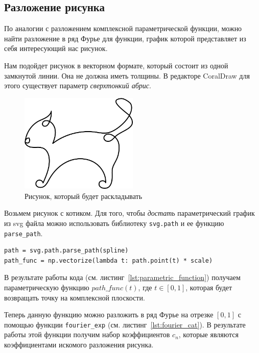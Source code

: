 \subsection{Разложение рисунка}
По аналогии с разложением комплексной параметрической функции, можно найти разложение в ряд Фурье для функции, график которой представляет из себя интересующий нас рисунок. 

Нам подойдет рисунок в векторном формате, который состоит из одной замкнутой линии. Она не должна иметь толщины. В редакторе CoralDraw для этого существует параметр \textit{сверхтонкий абрис}. 

\begin{figure}[ht!]
    \centering
    \includegraphics[width=0.5\textwidth]{./media/cat.jpg}
    \caption{Рисунок, который будет раскладывать}
    \label{fig:cat}
\end{figure}

Возьмем рисунок с котиком. Для того, чтобы \textit{достать} параметрический график из svg файла можно использовать библиотеку \texttt{svg.path} и ее функцию \texttt{parse\_path}. 

\begin{lstlisting}[style=python_white, caption={Получение параметрической функции рисунка}, label=lst:parametric_function]
path = svg.path.parse_path(spline)
path_func = np.vectorize(lambda t: path.point(t) * scale)
\end{lstlisting}

В результате работы кода (см. листинг~\ref{lst:parametric_function}) получаем параметрическую функцию $path\_func(t)$, где $t \in [0, 1]$, 
которая будет возвращать точку на комплексной плоскости. 

Теперь данную функцию можно разложить в ряд Фурье на отрезке $[0, 1]$ с помощью функции \texttt{fourier\_exp} (см. листинг~\ref{lst:fourier_cat}). 
В результате работы этой функции получим набор коэффициентов $c_n$, которые являются коэффициентами искомого разложения рисунка. 


